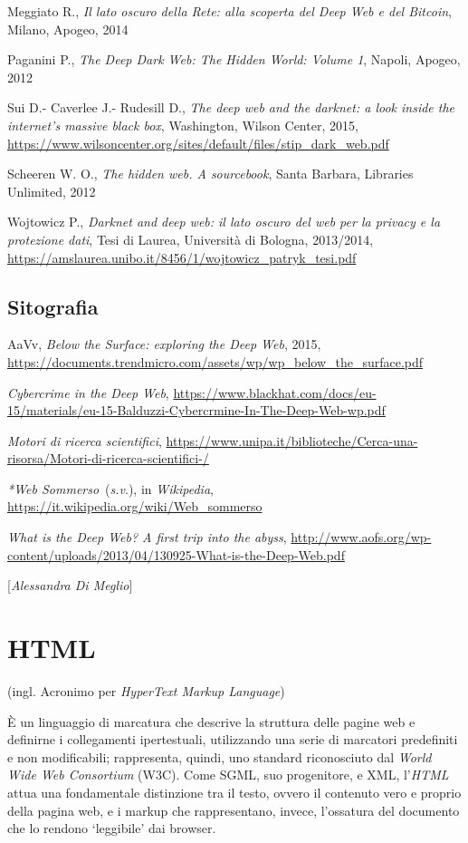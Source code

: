 {{Meggiato R., \emph{Il lato oscuro della Rete: alla scoperta del Deep Web
e del Bitcoin}, Milano, Apogeo, 2014

Paganini P., \emph{The Deep Dark Web: The Hidden World: Volume 1},
Napoli, Apogeo, 2012

Sui D.- Caverlee J.- Rudesill D., \emph{The deep web and the darknet: a
look inside the internet's massive black box}, Washington, Wilson
Center, 2015,
\url{https://www.wilsoncenter.org/sites/default/files/stip_dark_web.pdf}

Scheeren W. O., \emph{The hidden web. A sourcebook}, Santa Barbara,
Libraries Unlimited, 2012

Wojtowicz P., \emph{Darknet and deep web: il lato oscuro del web per la
privacy e la protezione dati}, Tesi di Laurea, Università di Bologna,
2013/2014,
\url{https://amslaurea.unibo.it/8456/1/wojtowicz_patryk_tesi.pdf}
}

\section*{Sitografia}
{\parindent0pt 
AaVv, \emph{Below the Surface: exploring the Deep Web}, 2015,
\url{https://documents.trendmicro.com/assets/wp/wp_below_the_surface.pdf}

\emph{Cybercrime in the Deep Web},
\url{https://www.blackhat.com/docs/eu-15/materials/eu-15-Balduzzi-Cybercrmine-In-The-Deep-Web-wp.pdf}

\emph{Motori di ricerca scientifici},
\url{https://www.unipa.it/biblioteche/Cerca-una-risorsa/Motori-di-ricerca-scientifici-/}

\emph{*Web Sommerso}~(\emph{s.v}.), in \emph{Wikipedia},
\url{https://it.wikipedia.org/wiki/Web_sommerso}

\emph{What is the Deep Web? A first trip into the abyss},
\url{http://www.aofs.org/wp-content/uploads/2013/04/130925-What-is-the-Deep-Web.pdf}
}

\hrulefill 

{[}\emph{Alessandra Di Meglio}{]}



\chapter{HTML}

(ingl. Acronimo per \emph{HyperText Markup Language})

È un linguaggio di marcatura che descrive la struttura delle pagine web
e definirne i collegamenti ipertestuali, utilizzando una serie di
marcatori predefiniti e non modificabili; rappresenta, quindi, uno
standard riconosciuto dal \emph{World Wide Web Consortium} (W3C). Come
SGML, suo progenitore, e XML, l'\emph{HTML} attua una fondamentale
distinzione tra il testo, ovvero il contenuto vero e proprio della
pagina web, e i markup che rappresentano, invece, l'ossatura del
documento che lo rendono `leggibile' dai browser.

}

